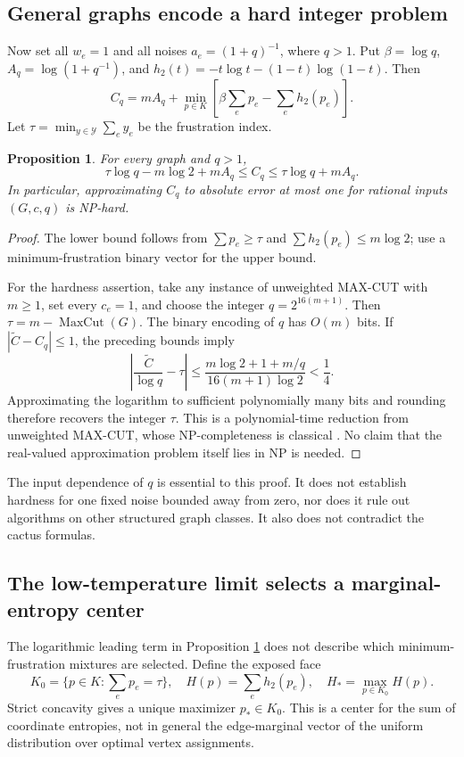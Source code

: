 \documentclass[11pt,a4paper]{article}
\newtheorem{proposition}[theorem]{Proposition}
\theoremstyle{definition}\newtheorem{definition}[theorem]{Definition}
\theoremstyle{remark}\newtheorem{remark}[theorem]{Remark}
\numberwithin{equation}{section}
\begin{document}
\subsection{General graphs encode a hard integer problem}\label{R08-sec-3}
Now set all $w_e=1$ and all noises $a_e=(1+q)^{-1}$, where $q>1$. Put $\beta=\log q$, $A_q=\log(1+q^{-1})$, and $h_2(t)=-t\log t-(1-t)\log(1-t)$. Then
\begin{equation}\label{R08-free}
 C_q=mA_q+\min_{p\in K}\left[\beta\sum_ep_e-\sum_eh_2(p_e)\right].
\end{equation}
Let $\tau=\min_{y\in\mathcal Y}\sum_e y_e$ be the frustration index.
\begin{proposition}\label{R08-rough}
For every graph and $q>1$,
\[
 \tau\log q-m\log2+mA_q\le C_q\le\tau\log q+mA_q.
\]
In particular, approximating $C_q$ to absolute error at most one for rational inputs $(G,c,q)$ is NP-hard.
\end{proposition}
\begin{proof}
The lower bound follows from $\sum p_e\ge\tau$ and $\sum h_2(p_e)\le m\log2$; use a minimum-frustration binary vector for the upper bound.

For the hardness assertion, take any instance of unweighted MAX-CUT with $m\ge1$, set every $c_e=1$, and choose the integer $q=2^{16(m+1)}$. Then $\tau=m-\operatorname{MaxCut}(G)$. The binary encoding of $q$ has $O(m)$ bits. If $|\widetilde C-C_q|\le1$, the preceding bounds imply
\[
 \left|\frac{\widetilde C}{\log q}-\tau\right|
 \le\frac{m\log2+1+m/q}{16(m+1)\log2}<\frac14.
\]
Approximating the logarithm to sufficient polynomially many bits and rounding therefore recovers the integer $\tau$. This is a polynomial-time reduction from unweighted MAX-CUT, whose NP-completeness is classical \cite{ref075}. No claim that the real-valued approximation problem itself lies in NP is needed.
\end{proof}

The input dependence of $q$ is essential to this proof. It does not establish hardness for one fixed noise bounded away from zero, nor does it rule out algorithms on other structured graph classes. It also does not contradict the cactus formulas.

\subsection{The low-temperature limit selects a marginal-entropy center}\label{R08-sec-4}
The logarithmic leading term in Proposition \ref{R08-rough} does not describe which minimum-frustration mixtures are selected. Define the exposed face
\[
 K_0=\{p\in K:\textstyle\sum_ep_e=\tau\},\quad
 H(p)=\sum_eh_2(p_e),\quad H_* =\max_{p\in K_0}H(p).
\]
Strict concavity gives a unique maximizer $p_*\in K_0$. This is a center for the sum of coordinate entropies, not in general the edge-marginal vector of the uniform distribution over optimal vertex assignments.
\end{document}
